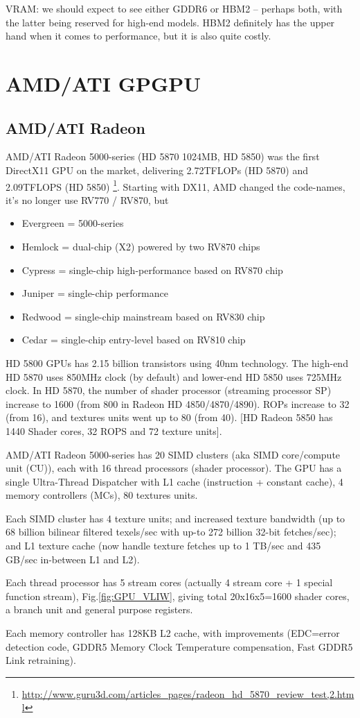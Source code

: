 VRAM: we should expect to see either GDDR6 or HBM2 – perhaps both, with the
latter being reserved for high-end models. HBM2 definitely has the upper hand
when it comes to performance, but it is also quite costly.




\chapter{AMD/ATI GPGPU}

\section{AMD/ATI Radeon}

AMD/ATI Radeon 5000-series (HD 5870 1024MB, HD 5850) was the first DirectX11 GPU
on the market, delivering
2.72TFLOPs (HD 5870) and 2.09TFLOPS (HD 5850)
\footnote{\url{http://www.guru3d.com/articles_pages/radeon_hd_5870_review_test,2.html}}.
Starting with DX11, AMD changed the code-names, it's no longer use RV770 /
RV870, but
\begin{itemize}
  \item Evergreen = 5000-series
  \item Hemlock = dual-chip (X2) powered by two RV870 chips
  \item Cypress = single-chip high-performance based on RV870 chip
  \item Juniper = single-chip performance 
  \item Redwood = single-chip mainstream based on RV830 chip
  \item Cedar = single-chip entry-level based on RV810 chip
\end{itemize}
HD 5800 GPUs has 2.15 billion transistors using 40nm technology. The high-end HD
5870 uses 850MHz clock (by default) and lower-end HD 5850 uses 725MHz clock.
In HD 5870, the number of shader processor (streaming processor SP) increase to
1600 (from 800 in Radeon HD 4850/4870/4890). ROPs increase to 32 (from 16), and
textures units  went up to 80 (from 40). [HD Radeon 5850 has 1440 Shader cores,
32 ROPS and 72 texture units]. 

\begin{framed}
AMD/ATI Radeon 5000-series has 20 SIMD clusters (aka SIMD core/compute unit
(CU)), each with 16 thread processors (shader processor). The GPU has a single
Ultra-Thread Dispatcher with L1 cache (instruction + constant cache), 4 memory
controllers (MCs), 80 textures units. 

Each SIMD cluster has 4 texture units; and increased texture bandwidth (up to 68
billion bilinear filtered texels/sec with up-to 272 billion 32-bit
fetches/sec); and L1 texture cache (now handle texture fetches up to 1 TB/sec
and 435 GB/sec in-between L1 and L2).

Each thread processor has 5 stream cores (actually 4 stream
core + 1 special function stream), Fig.\ref{fig:GPU_VLIW}, giving total
20x16x5=1600 shader cores, a branch unit and general purpose registers. 

Each memory controller has 128KB L2 cache, with improvements (EDC=error
detection code, GDDR5 Memory Clock Temperature compensation, Fast GDDR5 Link
retraining).
\end{framed}

